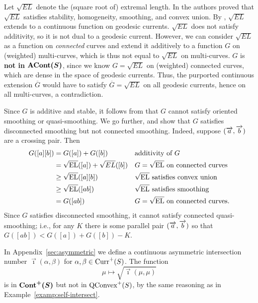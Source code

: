 \begin{example}
  \label{ex:linEL}
Let $\sqrt{EL}$ denote the (square root of) extremal length.
In \cite[Section 4.8]{MGT21:Smoothings} the authors proved that
$\sqrt{EL}$ satisfies stability, homogeneity, smoothing, and convex
union. By  \cite[Theorem~A]{MGT21:Smoothings}, $\sqrt{EL}$ extends to
a continuous function on geodesic currents.
$\sqrt{EL}$ does not satisfy additivity, so it is not dual to a
geodesic current. However, we can consider $\sqrt{EL}$ as a function
on \emph{connected} curves and extend it additively to a function
$G$ on (weighted)
multi-curves,
which is thus not equal to $\sqrt{EL}$ on multi-curves. $G$ is
\textbf{not in $\bm{\mathrm{ACont}(S)}$}, since we know $G=\sqrt{EL}$ on
(weighted) connected curves, which are dense in the space of geodesic
currents.
Thus, the purported continuous extension $\overline{G}$ would have to satisfy $\overline{G}=\sqrt{EL}$ on all geodesic currents, hence on all multi-curves, a contradiction.

Since $G$ is additive and stable, it follows from
\cite[Theorem~A]{MGT21:Smoothings} that $G$ cannot satisfy oriented
smoothing or quasi-smoothing. We go further, and show that $G$
satisfies disconnected smoothing
but not connected smoothing.
Indeed, suppose $(\overrightarrow{a}, \overrightarrow{b})$ are a crossing pair. Then
\begin{align*}
  G([a][b]) &= G([a]) + G([b]) &&\text{additivity of $G$}\\
   &= \sqrt{\operatorname{EL}}([a]) + \sqrt{EL}([b]) &&\text{$G=\sqrt{\operatorname{EL}}$ on connected curves}\\
   &\ge \sqrt{\operatorname{EL}}([a][b]) &&\text{$\sqrt{\operatorname{EL}}$ satisfies convex union}\\
   &\ge \sqrt{\operatorname{EL}}([ab]) &&\text{$\sqrt{\operatorname{EL}}$ satisfies smoothing}\\
   &= G([ab]) &&\text{$G=\sqrt{\operatorname{EL}}$ on connected curves}.
\end{align*}
Since $G$ satisfies disconnected smoothing, it cannot satisfy
connected quasi-smoothing; i.e., for any $K$ there is some parallel
pair $(\overrightarrow{a},\overrightarrow{b})$ so that $G([ab]) < G([a]) + G([b]) - K$.
\end{example}

\begin{example}
In Appendix~\ref{sec:asymmetric} we define a continuous asymmetric intersection
number $\vec\imath(\alpha,\beta)$ for $\alpha,\beta \in \operatorname{Curr}^+(S)$.
The function
\[
\mu \mapsto \sqrt{\vec\imath(\mu,\mu)}
\]
is in $\bm{\mathrm{Cont}^+(S)}$ but not in $\mathrm{QConvex}^+(S)$, by the same reasoning as
in Example~\ref{examp:self-intersect}.
\end{example}

